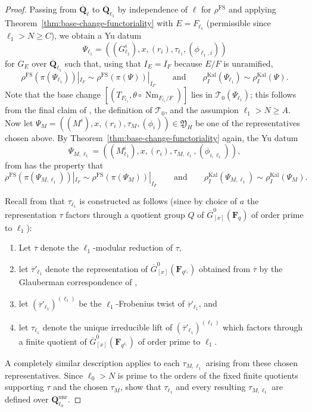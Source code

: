 \documentclass[reqno]{amsart}
\numberwithin{equation}{subsection}
\newcommand{\F}{\mathbf{F}}
\newcommand{\Q}{\mathbf{Q}}
\newcommand{\ol}[1]{\overline{#1}}
\newcommand\cT{\mathcal{T}}
\DeclareMathOperator{\Nm}{Nm}
\DeclareMathOperator{\unr}{unr}
\DeclareMathOperator{\FS}{FS}
\DeclareMathOperator{\Kal}{Kal}
\theoremstyle{remark}
\numberwithin{equation}{subsection}
\numberwithin{figure}{subsection}
\begin{document}
\begin{proof}
Passing from $\ol\Q_\ell$ to $\ol\Q_{\ell_1}$ by independence of $\ell$ for $\rho^{\FS}$ and applying Theorem~\ref{thm:base-change-functoriality} with $E = F_{\ell_1}$ (permissible since $\ell_1 > N \geq C$), we obtain a Yu datum
\[
\Psi_{\ell_1} = ((G^i_{\ell_1}), x, (r_i), \tau_{\ell_1}, (\phi_{\ell_1,i}))
\]
for $G_E$ over $\ol\Q_{\ell_1}$ such that, using that $I_E = I_F$ because $E/F$ is unramified,
\[
\rho^{\FS}(\pi(\Psi_{\ell_1}))|_{I_F} \sim \rho^{\FS}(\pi(\Psi))|_{I_F}
\qquad\text{and}\qquad
\rho_I^{\Kal}(\Psi_{\ell_1}) \sim \rho_I^{\Kal}(\Psi).
\]
Note that the base change $[(T_{F_{\ell_1}}, \theta \circ \Nm_{F_{\ell_1}/F})]$ lies in $\cT_0(\Psi_{\ell_1})$; this follows from the final claim of \cite[Proposition~4.3.4]{Cot26b}, the definition of $\cT_0$, and the assumpion $\ell_1 > N \geq A$. Now let $\Psi_M = ((M^i), x, (r_i), \tau_M, (\phi_i)) \in \mathfrak Y_H$ be one of the representatives chosen above. By Theorem~\ref{thm:base-change-functoriality} again, the Yu datum
\[
\Psi_{M,\ell_1} = ((M^i_{\ell_1}),x,(r_i),\tau_{M,\ell_1}, (\phi_{i,\ell_1})),
\]
from \cite[\S 8.2]{CF26a} has the property that
\[
\rho^{\FS}(\pi(\Psi_{M,\ell_1}))|_{I_F} \sim \rho^{\FS}(\pi(\Psi_M))|_{I_F}
\qquad\text{and}\qquad
\rho_I^{\Kal}(\Psi_{M,\ell_1}) \sim \rho_I^{\Kal}(\Psi_M).
\]

Recall from \cite[Definition~8.2.2]{CF26a} that $\tau_{\ell_1}$ is constructed as follows (since by choice of $a$ the representation $\tau$ factors through a quotient group $Q$ of $\ol G_{[x]}^0(\F_q)$ of order prime to $\ell_1$):
\begin{enumerate}
\item[(i)] Let $\ol\tau$ denote the $\ell_1$-modular reduction of $\tau$,
\item[(ii)] let $\ol\tau'_{\ell_1}$ denote the representation of $\ol G^0_{[x]}(\F_{q^{\ell_1}})$ obtained from $\ol\tau$ by the Glauberman correspondence of \cite[\S 3.5.3]{Cot26b},
\item[(iii)] let $(\ol\tau'_{\ell_1})^{(\ell_1)}$ be the $\ell_1$-Frobenius twist of $\ol\tau'_{\ell_1}$, and
\item[(iv)] let $\tau_{\ell_1}$ denote the unique irreducible lift of $(\ol\tau'_{\ell_1})^{(\ell_1)}$ which factors through a finite quotient of $\ol G^0_{[x]}(\F_{q^{\ell_1}})$ of order prime to $\ell_1$.
\end{enumerate}
A completely similar description applies to each $\tau_{M,\ell_1}$ arising from these chosen representatives. Since $\ell_0>N$ is prime to the orders of the fixed finite quotients supporting $\tau$ and the chosen $\tau_M$, \cite[Lemmas~3.5.14 and 3.5.15]{Cot26b} show that $\tau_{\ell_1}$ and every resulting $\tau_{M,\ell_1}$ are defined over $\Q_{\ell_0}^{\unr}$.



\end{proof}
\end{document}
